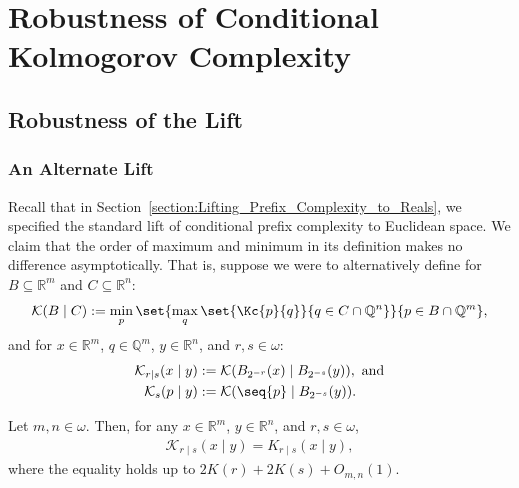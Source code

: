 \chapter{Robustness of Conditional Kolmogorov Complexity}\label{chapter:robustness_conditional_complexity}

\section{Robustness of the Lift}

\label{section:Robustness_of_the_Lift}

\subsection{An Alternate Lift}

Recall that in Section~\ref{section:Lifting_Prefix_Complexity_to_Reals}, we specified the standard lift of conditional prefix complexity to Euclidean space. We claim that the order of maximum and minimum in its definition makes no difference asymptotically. That is, suppose we were to alternatively define for $B \subseteq \mathbb{R}^m$ and $C \subseteq \mathbb{R}^n$:
\begin{align*} 
    \mathcal{K}(B \mid C) := \min_p \set{\max_q \set{\Kc{p}{q}}{q \in C \cap \mathbb{Q}^n}}{p \in B \cap \mathbb{Q}^m},
\end{align*}
and for $x \in \mathbb{R}^m$, $q \in \mathbb{Q}^m$, $y \in \mathbb{R}^n$, and $r, s \in \omega$:
\begin{align*}
    \mathcal{K}_{r \mid s}(x \mid y) &:= \mathcal{K}(B_{2^{-r}}(x) \mid B_{2^{-s}}(y)), \text{ and}\\
    \mathcal{K}_s(p \mid y) &:= \mathcal{K}(\seq{p} \mid B_{2^{-s}}(y)).
\end{align*}

\begin{theorem}
    \label{theorem:maxmin_and_minmax_conditional_complexity_equal}
    Let $m, n \in \omega$. Then, for any $x \in \mathbb{R}^m$, $y \in \mathbb{R}^n$, and $r, s \in \omega$,
    \begin{align*}
        \mathcal{K}_{r \mid s}(x \mid y) = K_{r \mid s}(x \mid y),
    \end{align*}
    where the equality holds up to $2K(r) + 2K(s) + O_{m, n}(1)$.
\end{theorem}


